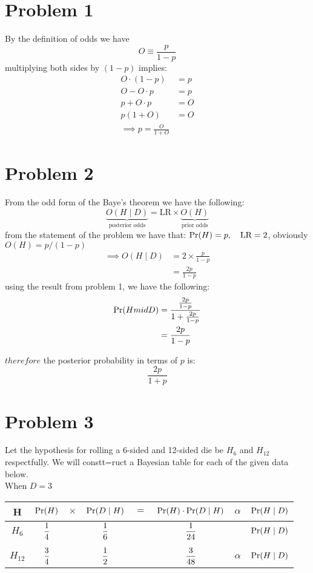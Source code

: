 \section{Problem 1}

By the definition of odds we have
\[
  O \equiv \frac{p}{1-p}
\]
multiplying both sides by $(1 - p)$ implies:
\begin{align*}
  O \cdot (1 - p) & = p \\
            O - O \cdot p    & = p \\
            p + O \cdot p & = O \\
            p(1 + O) & = O \\
    \implies p = \frac{O}{1 + O}
\end{align*}

\section{Problem 2}
From the odd form of the Baye's theorem we have the following:
\[
  \underbrace{O(H \mid D)}_{\text{posterior odds}} = \text{LR} \times \underbrace{O(H)}_{\text{prior odds}}
\]
from the statement of the problem we have that: $\mathrm{Pr}(H) = p,\quad \text{LR} = 2$, obviously $O(H) = p/(1 - p)$
\begin{align*}
  \implies O(H \mid D) &= 2 \times \frac{p}{1 - p} \\
  & = \frac{2p}{1 - p}
\end{align*}
using the result from problem 1, we have the following:
\begin{align*}
  \mathrm{Pr}(H mid D) & = \frac{\frac{2p}{1 - p}} {1 + \frac{2p}{1 - p}} \\ 
  & = \frac{2p}{1 - p}
\end{align*}

$therefore$ the posterior probability in terms of $p$ is:
\[
\frac{2p} {1 + p}
\]

\section{Problem 3}
Let the hypothesis for rolling a 6-sided and 12-sided die be $H_{6}$ and $H_{12}$ respectfully. We will constt=ruct a Bayesian table for each of the given data below.\\
When $D = 3$

\begin{tabular}[h]{cccccccc}
  H & $\mathrm{Pr}(H)$ & $\times$ & $\mathrm{Pr}(D \mid H)$ & $=$ & $ \mathrm{Pr}(H) \cdot \mathrm{Pr}(D \mid H)$ & $\alpha$ & $\mathrm{Pr}(H \mid D)$ \\
  \hline
$H_6$ & $\displaystyle\frac14$ &  & $\displaystyle\frac16$ & & $\displaystyle \frac{1}{24}$ & & $\mathrm{Pr}(H \mid D)$ \\
&&&&&&&\\
$H_{12}$ & $\displaystyle\frac34$ &  & $\displaystyle \frac12$ &  & $ \displaystyle \frac{3}{48}$ & $\alpha$ & $\mathrm{Pr}(H \mid D)$ \\
\end{tabular}

